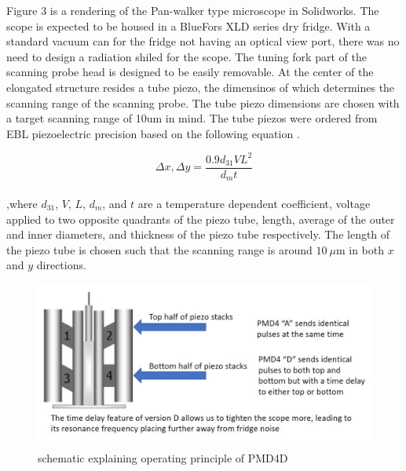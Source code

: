 \documentclass[11pt]{article}
\numberwithin{equation}{section}
\begin{document}
\hspace{\parindent}
Figure 3 is a rendering of the Pan-walker type microscope in Solidworks. The scope is expected to be housed in a BlueFors XLD series dry fridge. With a standard vacuum can for the fridge not having an optical view port, there was no need to design a radiation shiled for the scope. The tuning fork part of the scanning probe head is designed to be easily removable.  At the center of the elongated structure resides a tube piezo, the dimensinos of which determines the scanning range of the scanning probe. The tube piezo dimensions are chosen with a target scanning range of 10um in mind.   The tube piezos were ordered from EBL piezoelectric precision based on the following equation \cite{EBL}.  



\begin{equation}
\Delta x, \Delta y = \frac{0.9 d_{31} V L^{2}}{d_m t}
\end{equation}  \\

,where $d_{31}$, $V$, $L$, $d_m$, and $t$ are a temperature dependent coefficient, voltage applied to two opposite quadrants of the piezo tube, length, average of the outer and inner diameters, and thickness of the piezo tube respectively. The length of the piezo tube is chosen such that the scanning range is around \( 10\ \mu \)m in both $x$ and $y$ directions.\\

\begin{figure}
	\centering
	\includegraphics[scale=0.4] {pmd4dimage.jpg}
	\caption{schematic explaining operating principle of PMD4D}
	\label{pmd4image}
\end{figure}
\end{document}
